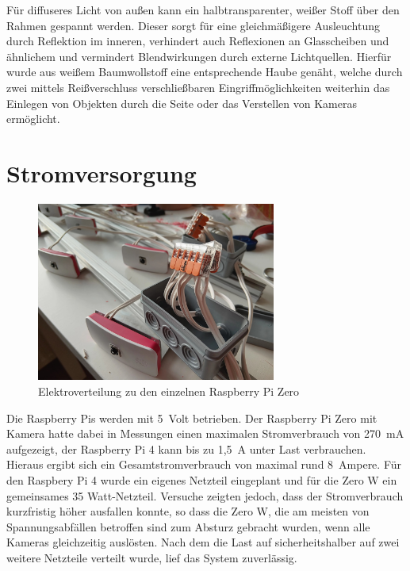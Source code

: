 \documentclass[./00PhotoBox.tex]{subfiles}
\begin{document}
Für diffuseres Licht von außen kann ein halbtransparenter, weißer Stoff über den Rahmen gespannt werden. Dieser sorgt für eine gleichmäßigere Ausleuchtung durch Reflektion im inneren, verhindert auch Reflexionen an Glasscheiben und ähnlichem und vermindert Blendwirkungen durch externe Lichtquellen. Hierfür wurde aus weißem Baumwollstoff eine entsprechende Haube genäht, welche durch zwei mittels Reißverschluss verschließbaren Eingriffmöglichkeiten weiterhin das Einlegen von Objekten durch die Seite oder das Verstellen von Kameras ermöglicht.


\section{Stromversorgung}

\begin{figure}
    \centering
    \includegraphics[width=0.7\textwidth]{./img/stromverteilung.jpg}
    \caption{Elektroverteilung zu den einzelnen Raspberry Pi Zero} %
    \label{img:stromverteilung} %
\end{figure}

Die Raspberry Pis werden mit 5~Volt betrieben. Der Raspberry Pi Zero mit Kamera hatte dabei in Messungen einen maximalen Stromverbrauch von 270~mA aufgezeigt, der Raspberry Pi 4 kann bis zu 1,5~A unter Last verbrauchen. Hieraus ergibt sich ein Gesamtstromverbrauch von maximal rund 8~Ampere. Für den Raspbery Pi 4 wurde ein eigenes Netzteil eingeplant und für die Zero W ein gemeinsames 35 Watt-Netzteil. Versuche zeigten jedoch, dass der Stromverbrauch kurzfristig höher ausfallen konnte, so dass die Zero W, die am meisten von Spannungsabfällen betroffen sind zum Absturz gebracht wurden, wenn alle Kameras gleichzeitig auslösten. Nach dem die Last auf sicherheitshalber auf zwei weitere Netzteile verteilt wurde, lief das System zuverlässig.
\end{document}
